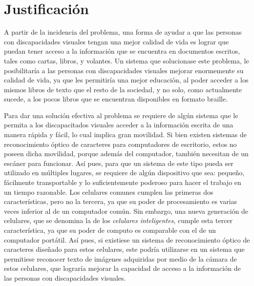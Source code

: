 \documentclass[a4paper, 11pt, oneside]{article}
\begin{document}
	\clearpage

	\section{Justificación}
	A partir de la incidencia del problema, una forma de ayudar a que las personas con discapacidades visuales tengan una mejor calidad de vida es lograr que puedan tener acceso a la información que se encuentra en documentos escritos, tales como cartas, libros, y volantes. Un sistema que solucionase este problema, le posibilitaría a las personas con discapacidades visuales mejorar enormemente su calidad de vida, ya que les permitiría una mejor educación, al poder acceder a los mismos libros de texto que el resto de la sociedad, y no solo, como actualmente sucede, a los pocos libros que se encuentran disponibles en formato braille.

	Para dar una solución efectiva al problema se requiere de algún sistema que le permita a los discapacitados visuales acceder a la información escrita de una manera rápida y fácil, lo cual implica gran movilidad. Si bien existen sistemas de reconocimiento óptico de caracteres para computadores de escritorio, estos no poseen dicha movilidad, porque además del computador, también necesitan de un escáner para funcionar. Así pues, para que un sistema de este tipo pueda ser utilizado en múltiples lugares, se requiere de algún dispositivo que sea: pequeño, fácilmente transportable y lo suficientemente poderoso para hacer el trabajo en un tiempo razonable. Los celulares comunes cumplen las primeras dos características, pero no la tercera, ya que su poder de procesamiento es varias veces inferior al de un computador común. Sin embargo, una nueva generación de celulares, que se denomina la de los \textit{celulares inteligentes}, cumple esta tercer característica, ya que su poder de computo es comparable con el de un computador portátil. Así pues, si existiese un sistema de reconocimiento óptico de caracteres diseñado para estos celulares, este podría utilizarse en un sistema que permitiese reconocer texto de imágenes adquiridas por medio de la cámara de estos celulares, que lograría mejorar la capacidad de acceso a la información de las personas con discapacidades visuales.
\end{document}

